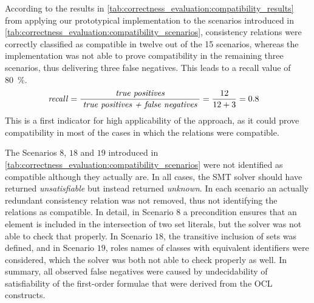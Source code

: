 According to the results in \autoref{tab:correctness_evaluation:compatibility_results} from applying our prototypical implementation to the scenarios introduced in \autoref{tab:correctness_evaluation:compatibility_scenarios}, consistency relations were correctly classified as compatible in twelve out of the 15 scenarios, whereas the implementation was not able to prove compatibility in the remaining three scenarios, thus delivering three false negatives.
This leads to a recall value of \SI{80}{\percent}.
\begin{align*}
    &
    \mathit{recall} = \frac{\; \textit{true positives} \;}{\; \textit{true positives + false negatives} \;} = \frac{12}{12+3} = 0.8
\end{align*}
%
%
This is a first indicator for high applicability of the approach, as it could prove compatibility in most of the cases in which the relations were compatible.

The Scenarios $8$, $18$ and $19$ introduced in \autoref{tab:correctness_evaluation:compatibility_scenarios} were not identified as compatible although they actually are.
In all cases, the \gls{SMT} solver should have returned \emph{unsatisfiable} but instead returned \emph{unknown}.
In each scenario an actually redundant consistency relation was not removed, thus not identifying the relations as compatible.
In detail, in Scenario $8$ a precondition ensures that an element is included in the intersection of two set literals, but the solver was not able to check that properly.
In Scenario $18$, the transitive inclusion of sets was defined, and in Scenario $19$, roles names of classes with equivalent identifiers were considered, which the solver was both not able to check properly as well.
In summary, all observed false negatives were caused by undecidability of satisfiability of the first-order formulae that were derived from the \gls{OCL} constructs.

